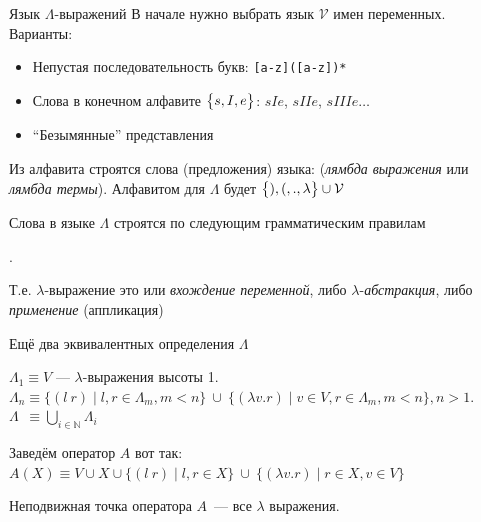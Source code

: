 \documentclass[aspectratio=169
  , xcolor={svgnames}
  , hyperref={colorlinks,citecolor=DeepPink4,linkcolor=DarkRed,urlcolor=DarkBlue}
  , russian  %
  ]{beamer}
\newcommand{\abs}[2]{\ensuremath{(\lambda #1 . #2)}}
\newcommand{\lam}[2]{\ensuremath{\abs{#1}{#2}}}
\newcommand{\app}[2]{\ensuremath{(#1 #2)}}
\begin{document}
\begin{frame}{Язык $\Lambda$-выражений}
В начале нужно выбрать язык $\mathcal{V}$ имен переменных. Варианты:

\begin{itemize}
  \item [\faCheck] Непустая последовательность букв: \texttt{[a-z]([a-z])*}
  \item [\faCheckEmpty] Слова в конечном алфавите $\big{\{}s, I, e\big{\}}$: $sIe$, $sIIe$, $sIIIe\dots$
  \item [\faCheckEmpty] \enquote{Безымянные} представления
\end{itemize}\vspace{1em}

Из алфавита строятся слова (предложения) языка: (\emph{лямбда выражения} или \emph{лямбда термы}).
Алфавитом для $\Lambda$ будет $\big{\{} \text{)}, \text{(}, ., \lambda \big{\}}\cup \mathcal{V}$\\\vspace{1em}

Слова в языке $\Lambda$ строятся по следующим грамматическим правилам
\begin{bnf*}
  { \bnfor
    \bnfts{$\big{(}\lambda$}  .  \bnfts{$\big )$} \bnfor
    \bnfts{$\big{(}$}  \bnfts{$\big )$}}\\
  {}
\end{bnf*}
Т.е. $\lambda$-выражение это или \emph{вхождение переменной}, либо $\lambda$-\emph{абстракция}, либо \emph{применение} (аппликация)
\end{frame}


\begin{frame}{Ещё два эквивалентных определения $\Lambda$}
\begin{definition}
$\Lambda_1 \equiv V$ --- $\lambda$-выражения высоты 1.\\
$\Lambda_n \equiv \{ \app{l\ }{r} \mid l,r\in \Lambda_m, m<n\}\ \cup\ \{ \lam{v}{r} \mid v\in V, r\in \Lambda_m, m<n \}, n>1$.\\
$\Lambda_{\phantom{n}} \equiv \bigcup_{i\in \mathbb{N}} \Lambda_i$
\end{definition}

\begin{definition}
Заведём оператор $A$ вот так:
$A(X) \equiv V\cup X\cup \{ \app{l\ }{r} \mid l,r\in X\}\ \cup\  \{ \lam{v}{r} \mid r \in X, v\in V\}$

Неподвижная точка оператора $A$~--- все $\lambda$ выражения.
\end{definition}

\end{frame}
\end{document}
